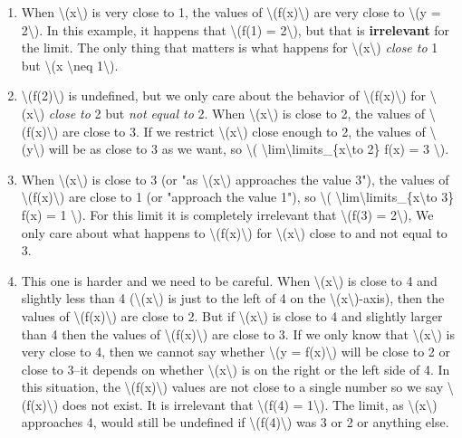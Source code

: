 \begin{enumerate}
\tightlist
\item
  When \textbackslash{}(x\textbackslash{}) is very close to 1, the
  values of \textbackslash{}(f(x)\textbackslash{}) are very close to
  \textbackslash{}(y = 2\textbackslash{}). In this example, it happens
  that \textbackslash{}(f(1) = 2\textbackslash{}), but that is
  \textbf{irrelevant} for the limit. The only thing that matters is what
  happens for \textbackslash{}(x\textbackslash{}) \emph{close to} 1 but
  \textbackslash{}(x \textbackslash{}neq 1\textbackslash{}).
\item
  \textbackslash{}(f(2)\textbackslash{}) is undefined, but we only care
  about the behavior of \textbackslash{}(f(x)\textbackslash{}) for
  \textbackslash{}(x\textbackslash{}) \emph{close to} 2 but \emph{not
  equal to} 2. When \textbackslash{}(x\textbackslash{}) is close to 2,
  the values of \textbackslash{}(f(x)\textbackslash{}) are close to 3.
  If we restrict \textbackslash{}(x\textbackslash{}) close enough to 2,
  the values of \textbackslash{}(y\textbackslash{}) will be as close to
  3 as we want, so \textbackslash{}(
  \textbackslash{}lim\textbackslash{}limits\_\{x\textbackslash{}to 2\}
  f(x) = 3 \textbackslash{}).
\item
  When \textbackslash{}(x\textbackslash{}) is close to 3 (or "as
  \textbackslash{}(x\textbackslash{}) approaches the value 3"), the
  values of \textbackslash{}(f(x)\textbackslash{}) are close to 1 (or
  "approach the value 1"), so \textbackslash{}(
  \textbackslash{}lim\textbackslash{}limits\_\{x\textbackslash{}to 3\}
  f(x) = 1 \textbackslash{}). For this limit it is completely irrelevant
  that \textbackslash{}(f(3) = 2\textbackslash{}), We only care about
  what happens to \textbackslash{}(f(x)\textbackslash{}) for
  \textbackslash{}(x\textbackslash{}) close to and not equal to 3.
\item
  This one is harder and we need to be careful. When
  \textbackslash{}(x\textbackslash{}) is close to 4 and slightly less
  than 4 (\textbackslash{}(x\textbackslash{}) is just to the left of 4
  on the \textbackslash{}(x\textbackslash{})-axis), then the values of
  \textbackslash{}(f(x)\textbackslash{}) are close to 2. But if
  \textbackslash{}(x\textbackslash{}) is close to 4 and slightly larger
  than 4 then the values of \textbackslash{}(f(x)\textbackslash{}) are
  close to 3. If we only know that \textbackslash{}(x\textbackslash{})
  is very close to 4, then we cannot say whether \textbackslash{}(y =
  f(x)\textbackslash{}) will be close to 2 or close to 3--it depends on
  whether \textbackslash{}(x\textbackslash{}) is on the right or the
  left side of 4. In this situation, the
  \textbackslash{}(f(x)\textbackslash{}) values are not close to a
  single number so we say \textbackslash{}(f(x)\textbackslash{}) does
  not exist. It is irrelevant that \textbackslash{}(f(4) =
  1\textbackslash{}). The limit, as \textbackslash{}(x\textbackslash{})
  approaches 4, would still be undefined if
  \textbackslash{}(f(4)\textbackslash{}) was 3 or 2 or anything else.
\end{enumerate}

